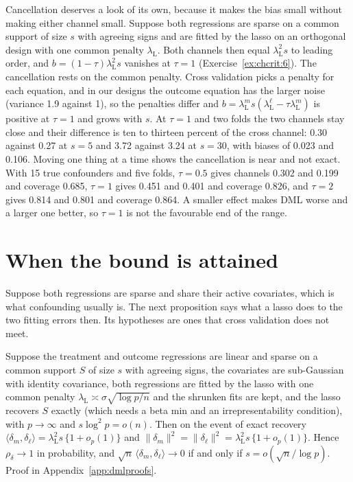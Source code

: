 Cancellation deserves a look of its own, because it makes the bias small without making either channel small. Suppose both regressions are sparse on a common support of size $s$ with agreeing signs and are fitted by the lasso on an orthogonal design with one common penalty $\lambda_{\mathrm L}$. Both channels then equal $\lambda_{\mathrm L}^2 s$ to leading order, and $b = (1 - \tau)\lambda_{\mathrm L}^2 s$ vanishes at $\tau = 1$ (Exercise~\ref{ex:chcrit:6}). The cancellation rests on the common penalty. Cross validation picks a penalty for each equation, and in our designs the outcome equation has the larger noise (variance 1.9 against 1), so the penalties differ and $b = \lambda_{\mathrm L}^m s(\lambda_{\mathrm L}^\ell - \tau\lambda_{\mathrm L}^m)$ is positive at $\tau = 1$ and grows with $s$. At $\tau = 1$ and two folds the two channels stay close and their difference is ten to thirteen percent of the cross channel: 0.30 against 0.27 at $s = 5$ and 3.72 against 3.24 at $s = 30$, with biases of 0.023 and 0.106. Moving one thing at a time shows the cancellation is near and not exact. With 15 true confounders and five folds, $\tau = 0.5$ gives channels 0.302 and 0.199 and coverage 0.685, $\tau = 1$ gives 0.451 and 0.401 and coverage 0.826, and $\tau = 2$ gives 0.814 and 0.801 and coverage 0.864. A smaller effect makes DML worse and a larger one better, so $\tau = 1$ is not the favourable end of the range.

\section{When the bound is attained}\label{sec:crit:align}

Suppose both regressions are sparse and share their active covariates, which is what confounding usually is. The next proposition says what a lasso does to the two fitting errors then. Its hypotheses are ones that cross validation does not meet.

\begin{proposition}\label{crit:prop:alignment}
Suppose the treatment and outcome regressions are linear and sparse on a common support $S$ of size $s$ with agreeing signs, the covariates are sub-Gaussian with identity covariance, both regressions are fitted by the lasso with one common penalty $\lambda_{\mathrm L} \asymp \sigma\sqrt{\log p/n}$ and the shrunken fits are kept, and the lasso recovers $S$ exactly (which needs a beta min and an irrepresentability condition), with $p \to \infty$ and $s\log^2 p = o(n)$. Then on the event of exact recovery $\langle\delta_m,\delta_\ell\rangle = \lambda_{\mathrm L}^2 s\,\{1 + o_p(1)\}$ and $\|\delta_m\|^2 = \|\delta_\ell\|^2 = \lambda_{\mathrm L}^2 s\,\{1 + o_p(1)\}$. Hence $\rho_\delta \to 1$ in probability, and $\sqrt n\,\langle\delta_m,\delta_\ell\rangle \to 0$ if and only if $s = o(\sqrt n/\log p)$. Proof in Appendix~\ref{app:dmlproofs}.
\end{proposition}

